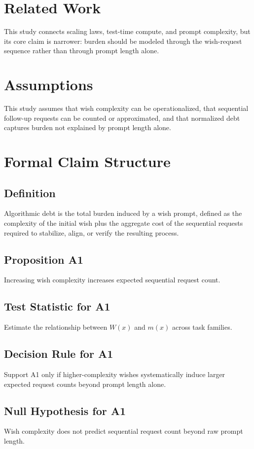 \documentclass[11pt]{article}
\begin{document}
\section{Related Work}
This study connects scaling laws, test-time compute, and prompt complexity, but its core claim is narrower: burden should be modeled through the wish-request sequence rather than through prompt length alone.

\section{Assumptions}
This study assumes that wish complexity can be operationalized, that sequential follow-up requests can be counted or approximated, and that normalized debt captures burden not explained by prompt length alone.

\section{Formal Claim Structure}

\subsection{Definition}
Algorithmic debt is the total burden induced by a wish prompt, defined as the complexity of the initial wish plus the aggregate cost of the sequential requests required to stabilize, align, or verify the resulting process.

\subsection{Proposition A1}
Increasing wish complexity increases expected sequential request count.

\subsection{Test Statistic for A1}
Estimate the relationship between $W(x)$ and $m(x)$ across task families.

\subsection{Decision Rule for A1}
Support A1 only if higher-complexity wishes systematically induce larger expected request counts beyond prompt length alone.

\subsection{Null Hypothesis for A1}
Wish complexity does not predict sequential request count beyond raw prompt length.
\end{document}
